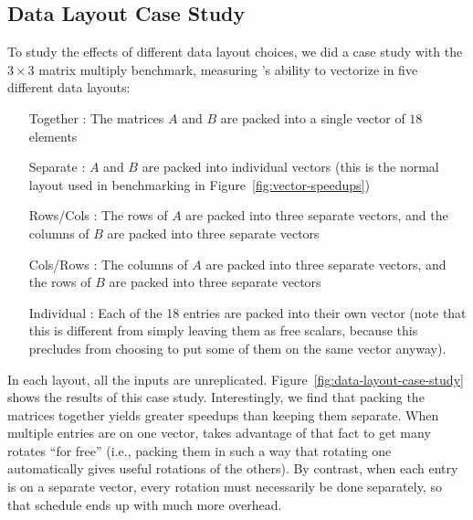 \subsection{Data Layout Case Study}
To study the effects of different data layout choices, we did a case study with the $3\times 3$ matrix multiply benchmark, measuring \system's ability to vectorize in five different data layouts:
\begin{itemize}
    \item[Together]: The matrices $A$ and $B$ are packed into a single vector of $18$ elements
    \item[Separate]: $A$ and $B$ are packed into individual vectors (this is the normal layout used in benchmarking in Figure~\ref{fig:vector-speedups})
    \item[Rows/Cols]: The rows of $A$ are packed into three separate vectors, and the columns of $B$ are packed into three separate vectors
    \item[Cols/Rows]: The columns of $A$ are packed into three separate vectors, and the rows of $B$ are packed into three separate vectors
    \item[Individual]: Each of the 18 entries are packed into their own vector (note that this is different from simply leaving them as free scalars, because this precludes \system from choosing to put some of them on the same vector anyway).     
\end{itemize}
In each layout, all the inputs are unreplicated.
Figure~\ref{fig:data-layout-case-study} shows the results of this case study.
Interestingly, we find that packing the matrices together yields greater speedups than keeping them separate.
When multiple entries are on one vector, \system takes advantage of that fact to get many rotates ``for free'' (i.e., packing them in such a way that rotating one automatically gives useful rotations of the others).
By contrast, when each entry is on a separate vector, every rotation must necessarily be done separately, so that schedule ends up with much more overhead.

